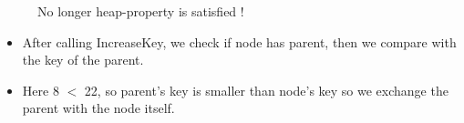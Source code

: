 \begin{figure}[h]
\caption{No longer heap-property is satisfied !}
\end{figure}

\begin{itemize}
    \item After calling IncreaseKey, we check if node has parent, then we compare with the key of the parent.
    \item Here 8 $<$ 22, so parent's key is smaller than node's key so we exchange the parent with the node itself.
\end{itemize}

